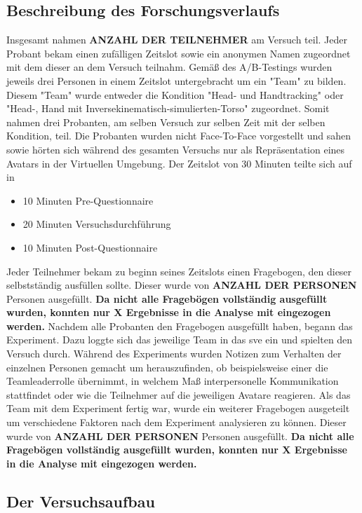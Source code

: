 \documentclass[a4paper,11pt]{article}%
\renewcommand{\\}{\vspace*{0.5\baselineskip} \newline}
\begin{document}
{		\subsection{Beschreibung des Forschungsverlaufs}
		Insgesamt nahmen \textbf{ANZAHL DER TEILNEHMER} am Versuch teil.
		Jeder Probant bekam einen zufälligen Zeitslot sowie ein anonymen Namen zugeordnet mit dem dieser an dem Versuch teilnahm. Gemäß des A/B-Testings wurden jeweils drei Personen in einem Zeitslot untergebracht um ein "Team" zu bilden. Diesem "Team" wurde entweder die Kondition "Head- und Handtracking" oder "Head-, Hand mit Inversekinematisch-simulierten-Torso" zugeordnet. Somit nahmen drei Probanten, am selben Versuch zur selben Zeit mit der selben Kondition, teil. Die Probanten wurden nicht Face-To-Face vorgestellt und sahen sowie hörten sich während des gesamten Versuchs nur als Repräsentation eines Avatars in der Virtuellen Umgebung. Der Zeitslot von 30 Minuten teilte sich auf in
		\begin{itemize}
			\item 10 Minuten Pre-Questionnaire
			\item 20 Minuten Versuchsdurchführung
			\item 10 Minuten Post-Questionnaire
		\end{itemize}
		Jeder Teilnehmer bekam zu beginn seines Zeitslots einen Fragebogen, den dieser selbstständig ausfüllen sollte. Dieser wurde von \textbf{ANZAHL DER PERSONEN} Personen ausgefüllt. \textbf{Da nicht alle Fragebögen vollständig ausgefüllt wurden, konnten nur X Ergebnisse in die Analyse mit eingezogen werden.}
		Nachdem alle Probanten den Fragebogen ausgefüllt haben, begann das Experiment. Dazu loggte sich das jeweilige Team in das \ac{sve} ein und spielten den Versuch durch.
		Während des Experiments wurden Notizen zum Verhalten der einzelnen Personen gemacht um herauszufinden, ob beispielsweise einer die Teamleaderrolle übernimmt, in welchem Maß interpersonelle Kommunikation stattfindet oder wie die Teilnehmer auf die jeweiligen Avatare reagieren.
		Als das Team mit dem Experiment fertig war, wurde ein weiterer Fragebogen ausgeteilt um verschiedene Faktoren nach dem Experiment analysieren zu können. Dieser wurde von \textbf{ANZAHL DER PERSONEN} Personen ausgefüllt. \textbf{Da nicht alle Fragebögen vollständig ausgefüllt wurden, konnten nur X Ergebnisse in die Analyse mit eingezogen werden.}
		
		\subsection{Der Versuchsaufbau}
		
}
\end{document}
